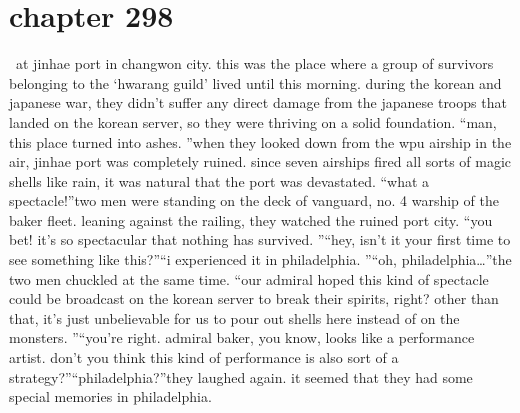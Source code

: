 \section{chapter 298}






 at jinhae port in changwon city.
this was the place where a group of survivors belonging to the ‘hwarang guild’ lived until this morning.
 during the korean and japanese war, they didn’t suffer any direct damage from the japanese troops that landed on the korean server, so they were thriving on a solid foundation.
“man, this place turned into ashes.
”when they looked down from the wpu airship in the air, jinhae port was completely ruined.
since seven airships fired all sorts of magic shells like rain, it was natural that the port was devastated.
“what a spectacle!”two men were standing on the deck of vanguard, no.
 4 warship of the baker fleet.
 leaning against the railing, they watched the ruined port city.
“you bet! it’s so spectacular that nothing has survived.
”“hey, isn’t it your first time to see something like this?”“i experienced it in philadelphia.
”“oh, philadelphia…”the two men chuckled at the same time.
“our admiral hoped this kind of spectacle could be broadcast on the korean server to break their spirits, right? other than that, it’s just unbelievable for us to pour out shells here instead of on the monsters.
”“you’re right.
 admiral baker, you know, looks like a performance artist.
 don’t you think this kind of performance is also sort of a strategy?”“philadelphia?”they laughed again.
 it seemed that they had some special memories in philadelphia.

